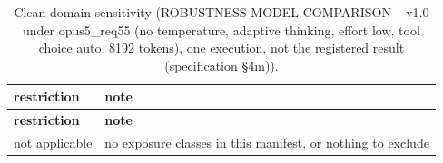 \begingroup\footnotesize
\begin{longtable}{>{\raggedright\arraybackslash}p{126.4pt}>{\raggedright\arraybackslash}p{304.6pt}}
\caption{Clean-domain sensitivity (ROBUSTNESS MODEL COMPARISON -- v1.0 under opus5\_\allowbreak{}req55 (no temperature, adaptive thinking, effort low, tool choice auto, 8192 tokens), one execution, not the registered result (specification §4m)).} \\
\toprule
\textbf{restriction} & \textbf{note} \\
\midrule
\endfirsthead
\toprule
\textbf{restriction} & \textbf{note} \\
\midrule
\endhead
\bottomrule
\endfoot
not applicable & no exposure classes in this manifest, or nothing to exclude \\
\end{longtable}
\endgroup
